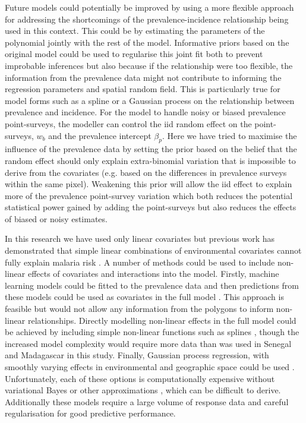\documentclass{statsoc}
\begin{document}
Future models could potentially be improved by using a more flexible approach for addressing the shortcomings of the prevalence-incidence relationship \citep{cameron2015defining} being used in this context.
This could be by estimating the parameters of the polynomial jointly with the rest of the model.
Informative priors based on the original model could be used to regularise this joint fit both to prevent improbable inferences but also because if the relationship were too flexible, the information from the prevalence data might not contribute to informing the regression parameters and spatial random field.
This is particularly true for model forms such as a spline or a Gaussian process on the relationship between prevalence and incidence.
For the model to handle noisy or biased prevalence point-surveys, the modeller can control the iid random effect on the point-surveys, $w_b$ and the prevalence intercept $\beta_p$. 
Here we have tried to maximise the influence of the prevalence data by setting the prior based on the belief that the random effect should only explain extra-binomial variation that is impossible to derive from the covariates (e.g. based on the differences in prevalence surveys within the same pixel).
Weakening this prior will allow the iid effect to explain more of the prevalence point-survey variation which both reduces the potential statistical power gained by adding the point-surveys but also reduces the effects of biased or noisy estimates.

In this research we have used only linear covariates but previous work has demonstrated that simple linear combinations of environmental covariates cannot fully explain malaria risk \citep{bhatt2017improved}.
A number of methods could be used to include non-linear effects of covariates and interactions into the model.
Firstly, machine learning models could be fitted to the prevalence data and then predictions from these models could be used as covariates in the full model \citep{bhatt2017improved}.
This approach is feasible but would not allow any information from the polygons to inform non-linear relationships.
Directly modelling non-linear effects in the full model could be achieved by including simple non-linear functions such as splines \citep{sissoko2017temporal, sewe2017using, hundessa2018projecting}, though the increased model complexity would require more data than was used in Senegal and Madagascar in this study.
Finally, Gaussian process regression, with smoothly varying effects in environmental and geographic space could be used \citep{law2018variational}.
Unfortunately, each of these options is computationally expensive without variational Bayes or other approximations \citep{law2018variational, ton2018spatial}, which can be difficult to derive.
Additionally these models require a large volume of response data and careful regularisation for good predictive performance.
\end{document}
